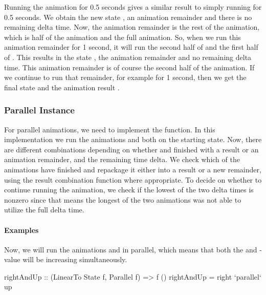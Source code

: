 Running the  animation for 0.5 seconds gives a similar result to simply running  for 0.5 seconds. We obtain the new state , an animation remainder  and there is no remaining delta time. Now, the animation remainder is the rest of the  animation, which is half of the  animation and the full  animation. So, when we run this animation remainder for 1 second, it will run the second half of  and the first half of .
This results in the state , the animation remainder  and no remaining delta time. This animation remainder is of course the second half of the  animation. If we continue to run that remainder, for example for 1 second, then we get the final state  and the animation result \hs{()}.


\subsubsection{Parallel Instance}

For parallel animations, we need to implement the  function. In this implementation we run the animations  and  both on the starting state. Now, there are different combinations depending on whether  and  finished with a result or an animation remainder, and the remaining time delta. We check which of the animations have finished and repackage it either into a result or a new remainder, using the result combination function where appropriate. To decide on whether to continue running the animation, we check if the lowest of the two delta times is nonzero since that means the longest of the two animations was not able to utilize the full delta time.

\paragraph{Examples}

Now, we will run the animations  and  in parallel, which means that both the  and -value will be increasing simultaneously.

\begin{code}
rightAndUp :: (LinearTo State f, Parallel f) => f ()
rightAndUp = right `parallel` up
\end{code}


